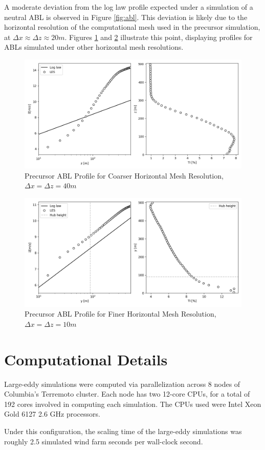 \documentclass[11pt]{article}
\begin{document}
A moderate deviation from the log law profile expected under a simulation of a
neutral ABL is observed in Figure \ref{fig:abl}. This deviation is likely due
to the horizontal resolution of the computational mesh used in the precursor
simulation, at $\Delta x \approx \Delta z \approx 20m$. Figures \ref{fig:supp_abl_40m}
and \ref{fig:supp_abl_10m} illustrate this point,
displaying profiles for ABLs simulated under other horizontal mesh resolutions.

\begin{figure}[ht]
    \centering
    \includegraphics[scale=0.5]{40m_precursor_stats.png}
    \caption{Precursor ABL Profile for Coarser Horizontal Mesh Resolution, $\Delta x = \Delta z = 40m$}
    \label{fig:supp_abl_40m}
\end{figure}

\begin{figure}[ht]
    \centering
    \includegraphics[scale=0.5]{10m_precursor_stats.png}
    \caption{Precursor ABL Profile for Finer Horizontal Mesh Resolution, $\Delta x = \Delta z = 10m$}
    \label{fig:supp_abl_10m}
\end{figure}

\section{Computational Details}
Large-eddy simulations were computed via parallelization across 8 nodes of
Columbia's Terremoto cluster. Each node has two 12-core CPUs, for a total of
192 cores involved in computing each simulation. The CPUs used were Intel Xeon
Gold 6127 2.6 GHz processors.

Under this configuration, the scaling time of the large-eddy simulations
was roughly 2.5 simulated wind farm seconds per wall-clock second.
\end{document}
